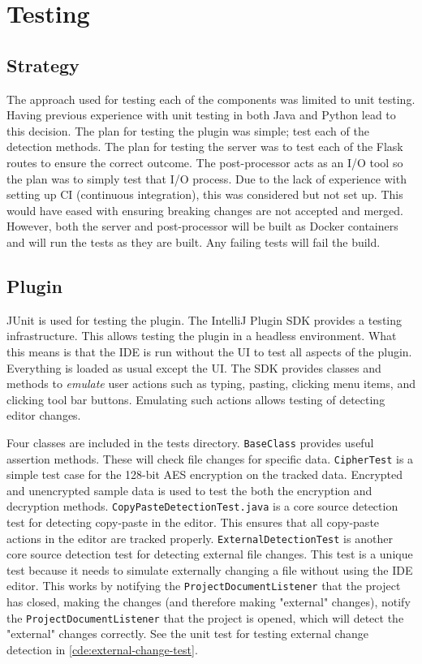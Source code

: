 \chapter{Testing}
\label{chp:testing}
\section{Strategy}
The approach used for testing each of the components was limited to unit testing. Having previous experience with unit testing in both Java and Python lead to this decision. The plan for testing the plugin was simple; test each of the detection methods. The plan for testing the server was to test each of the Flask routes to ensure the correct outcome. The post-processor acts as an I/O tool so the plan was to simply test that I/O process. Due to the lack of experience with setting up CI (continuous integration), this was considered but not set up. This would have eased with ensuring breaking changes are not accepted and merged. However, both the server and post-processor will be built as Docker containers and will run the tests as they are built. Any failing tests will fail the build.

\section{Plugin}
JUnit is used for testing the plugin. The IntelliJ Plugin SDK provides a testing infrastructure. This allows testing the plugin in a headless environment. What this means is that the IDE is run without the UI to test all aspects of the plugin. Everything is loaded as usual except the UI. The SDK provides classes and methods to \textit{emulate} user actions such as typing, pasting, clicking menu items, and clicking tool bar buttons. Emulating such actions allows testing of detecting editor changes.

Four classes are included in the tests directory. \texttt{BaseClass} provides useful assertion methods. These will check file changes for specific data. \texttt{CipherTest} is a simple test case for the 128-bit AES encryption on the tracked data. Encrypted and unencrypted sample data is used to test the both the encryption and decryption methods. \texttt{CopyPasteDetectionTest.java} is a core source detection test for detecting copy-paste in the editor. This ensures that all copy-paste actions in the editor are tracked properly. \texttt{ExternalDetectionTest} is another core source detection test for detecting external file changes. This test is a unique test because it needs to simulate externally changing a file without using the IDE editor. This works by notifying the \texttt{ProjectDocumentListener} that the project has closed, making the changes (and therefore making "external" changes), notify the \texttt{ProjectDocumentListener} that the project is opened, which will detect the "external" changes correctly. See the unit test for testing external change detection in \autoref{cde:external-change-test}.

